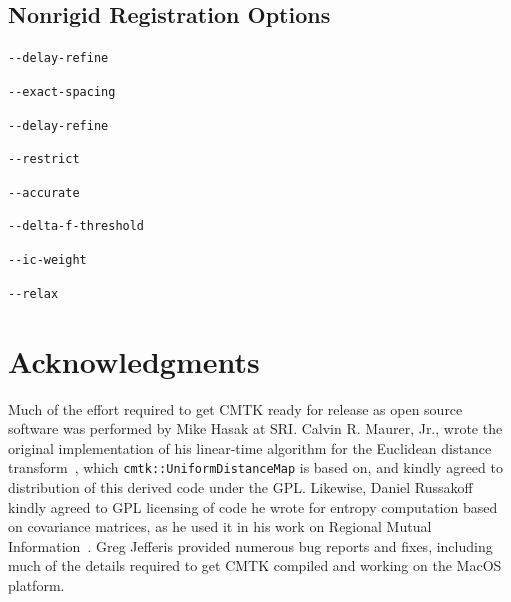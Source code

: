 \documentclass{InsightArticle}
\begin{document}
\subsection{Nonrigid Registration Options}

\verb|--delay-refine|

\verb|--exact-spacing|

\verb|--delay-refine|

\verb|--restrict|

\verb|--accurate|

\verb|--delta-f-threshold|

\verb|--ic-weight| \cite{ChriJohn:2001}

\verb|--relax| \cite{RohlMaurBlue:2003b}

\clearpage
\section*{Acknowledgments}

Much of the effort required to get CMTK ready for release as open source
software was performed by Mike Hasak at SRI. Calvin R. Maurer, Jr., wrote the
original implementation of his linear-time algorithm for the Euclidean
distance transform~\cite{MaurQiRagh:2003}, which
\verb|cmtk::UniformDistanceMap| is based on, and kindly agreed to distribution
of this derived code under the GPL. Likewise, Daniel Russakoff kindly agreed
to GPL licensing of code he wrote for entropy computation based on covariance
matrices, as he used it in his work on Regional Mutual
Information~\cite{RussTomaRohl:2004}. Greg Jefferis provided numerous bug
reports and fixes, including much of the details required to get CMTK compiled
and working on the MacOS platform.

%
%



\end{document}
